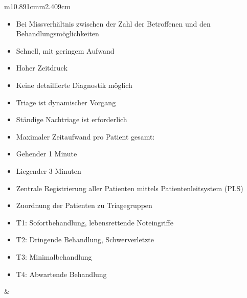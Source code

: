 \documentclass{article}
\begin{document}
\begin{center}
\tablehead{}\begin{supertabular}{m{10.891cm}m{2.409cm}}
\begin{itemize}
\item Bei Missverh\"altnis zwischen der Zahl der Betroffenen und den
Be\-handlungs\-m\"oglich\-keiten

\item Schnell, mit geringem Aufwand

\item Hoher Zeitdruck

\item Keine detaillierte Diagnostik m\"oglich

\item Triage ist dynamischer Vorgang

\item St\"andige Nachtriage ist erforderlich

\item Maximaler Zeitaufwand pro Patient gesamt:

\end{itemize}
\begin{itemize}
\item Gehender 1 Minute

\item Liegender 3 Minuten 

\end{itemize}
\begin{itemize}
\item Zentrale Registrierung aller Patienten mittels Patientenleitsystem
(PLS)

\item Zuordnung der Patienten zu Triagegruppen

\end{itemize}
\begin{itemize}
\item T1: Sofortbehandlung, lebensrettende Noteingriffe

\item T2: Dringende Behandlung, Schwerverletzte

\item T3: Minimalbehandlung

\item T4: Abwartende Behandlung

\end{itemize}
 &
 \par

\\
\end{supertabular}
\end{center}
\end{document}
